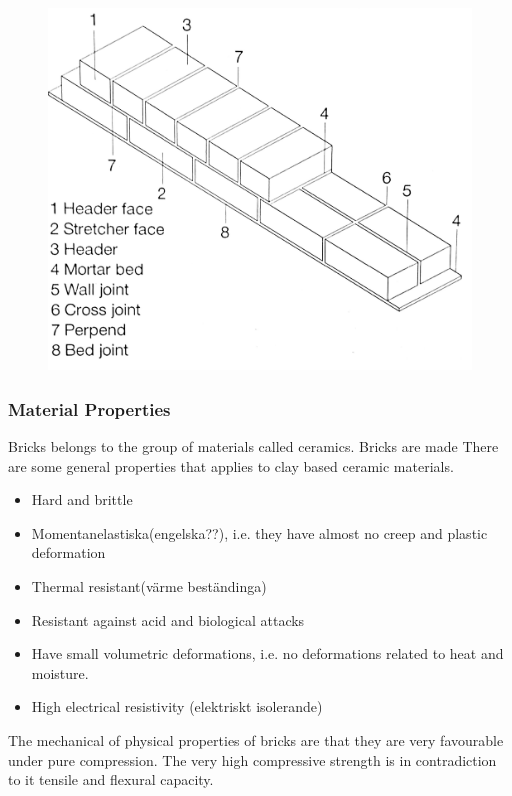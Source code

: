 \begin{figure}[H]
\centering
\includegraphics[width=0.6\linewidth ]{figure/Introduction/brickterm.pdf}
\caption{\cite{ref:Pfeifer}}
\end{figure}




\subsubsection{Material Properties}

Bricks belongs to the group of materials called ceramics. Bricks are made
There are some general properties that applies to clay based ceramic materials.\\

\begin{itemize}
\item Hard and brittle
\item Momentanelastiska(engelska??),
i.e. they have almost no creep and plastic deformation
\item Thermal resistant(värme beständinga)
\item Resistant against acid and biological attacks
\item Have small volumetric deformations,
i.e. no deformations related to heat and moisture.
\item High electrical resistivity  (elektriskt isolerande)
\end{itemize}

The mechanical of physical properties of bricks are that they are very favourable under pure compression. The very high compressive strength is in contradiction to it tensile and flexural capacity. 

